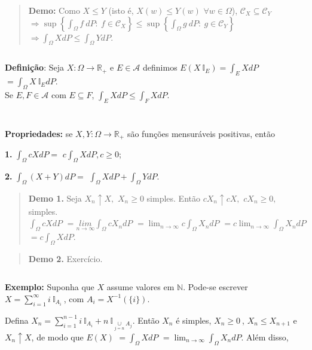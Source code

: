 \documentclass[
]{book}
\begin{document}
\begin{quote}
\textbf{Demo:} Como \(X \leq Y\) (isto é, \(X(w) \leq Y(w)\) \(\forall w \in \Omega\)), \(\mathcal{C}_X \subseteq \mathcal{C}_Y\)\\
\(\Rightarrow \sup\left\{\displaystyle\int_\Omega f~dP:~ f\in \mathcal{C}_X\right\} \leq \sup\left\{\displaystyle\int_\Omega g~dP:~ g\in \mathcal{C}_Y\right\}\) \(\Rightarrow \displaystyle\int_\Omega XdP \leq \displaystyle\int_\Omega YdP\).
\end{quote}

\(~\)

\textbf{Definição}: Seja \(X:\Omega \longrightarrow\mathbb{R}_+\) e \(E \in \mathcal{A}\) definimos \(E(X~\mathbb{I}_E) = \displaystyle\int_EXdP\) \(=\displaystyle\int_\Omega X~\mathbb{I}_EdP\).\\
Se \(E,F \in \mathcal{A}\) com \(E\subseteq F\), \(\displaystyle\int_E XdP \leq \int_F XdP.\)

\(~\)

\(~\)

\textbf{Propriedades:} se \(X, Y: \Omega \longrightarrow \mathbb{R}_+\) são funções mensuráveis positivas, então

\textbf{1.} \(\displaystyle\int_\Omega cXdP =\) \(c\displaystyle\int_\Omega XdP, c\geq 0\);

\textbf{2.} \(\displaystyle\int_\Omega (X+Y)dP =\) \(\displaystyle\int_\Omega XdP + \int_\Omega YdP\).

\begin{quote}
\textbf{Demo 1.} Seja \(X_n\uparrow X,\) \(X_n \geq 0\) simples. Então \(cX_n\uparrow cX,\) \(cX_n \geq 0,\) simples.\\
\(\displaystyle\int_\Omega cX dP\) \(=\underset{n\rightarrow\infty}{lim}\int_\Omega cX_n dP\) \(=\displaystyle\lim_{n\rightarrow\infty}c\int_\Omega X_n dP\) \(=\displaystyle c\lim_{n\rightarrow\infty}\int_\Omega X_n dP\) \(=\displaystyle c\int_\Omega X dP\).
\end{quote}

\begin{quote}
\textbf{Demo 2.} Exercício.
\end{quote}

\(~\)

\textbf{Exemplo:} Suponha que \(X\) assume valores em \(\mathbb{N}\). Pode-se escrever \(X =\displaystyle\sum_{i=1}^\infty i ~\mathbb{I}_{A_i}~\), com \(A_i = X^{-1}\left(\{i\}\right)\).

Defina \(X_n =\displaystyle\sum_{i=1}^{n-1} i ~\mathbb{I}_{A_i}+n~\mathbb{I}_{\underset{j=n}{\cup} A_j}\). Então \(X_n\) é simples, \(X_n \geq 0~\), \(X_n \leq X_{n+1}\) e \(X_n \uparrow X\), de modo que \(E(X)\) \(=\displaystyle\int_\Omega X dP\) \(=\displaystyle\lim_{n \rightarrow\infty}\int_\Omega X_n dP\). Além disso,
\end{document}

